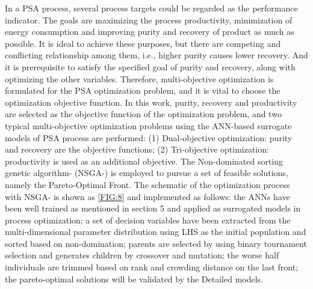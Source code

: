 \documentclass[preprint,12pt]{elsarticle}
\begin{document}
In a PSA process, several process targets could be regarded as the performance indicator. The goals are maximizing the process productivity, minimization of energy consumption and improving purity and recovery of product as much as possible. It is ideal to achieve these purposes, but there are competing and conflicting relationship among them, i.e., higher purity causes lower recovery. And it is prerequisite to satisfy the specified goal of purity and recovery, along with optimizing the other variables. Therefore, multi-objective optimization is formulated for the PSA optimization problem, and it is vital to choose the optimization objective function\cite{RN55}. In this work, purity, recovery and productivity are selected as the objective function of the optimization problem, and two typical multi-objective optimization problems using the ANN-based surrogate models of PSA process are performed: (1) Dual-objective optimization: purity and recovery are the objective functions; (2) Tri-objective optimization: productivity is used as an additional objective. The Non-dominated sorting genetic algorithm-\uppercase\expandafter{} (NSGA-\uppercase\expandafter{}) is employed to pursue a set of feasible solutions, namely the Pareto-Optimal Front. The schematic of the optimization process with NSGA-\uppercase\expandafter{} is shown as \cref{FIG:8} and implemented as follows: the ANNs have been well trained as mentioned in section 5 and applied as surrogated models in process optimization; a set of decision variables have been extracted from the multi-dimensional parameter distribution using LHS as the initial population and sorted based on non-domination; parents are selected by using binary tournament selection and generates children by crossover and mutation; the worse half individuals are trimmed based on rank and crowding distance on the last front; the pareto-optimal solutions will be validated by the Detailed models.
\end{document}
